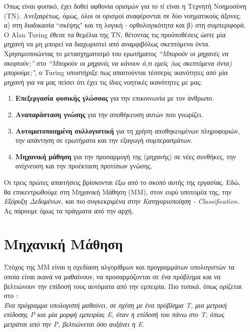 Όπως είναι φυσικό, έχει δοθεί αφθονία ορισμών για το \emph{τί} είναι η Τεχνητή Νοημοσύνη (ΤΝ). Ανεξαιρέτως, όμως, όλοι οι ορισμοί αναφέρονται σε δύο νοηματικούς άξονες: α) στη διαδικασία “σκέψης" και τη λογική - ορθολογικότητα και β) στη συμπεριφορά. Ο Alan Turing έθεσε τα θεμέλια της ΤΝ, θέτοντας τις προϋποθέσεις ώστε μία μηχανή να μη μπορεί να διαχωριστεί από αναμφιβόλως σκεπτόμενα όντα. Χρησιμοποιώντας το μετασχηματισμό του ερωτήματος \emph{“Μπορούν οι μηχανές να σκεφτούν;”} στο \emph{“Μπορούν οι μηχανές να κάνουν ό,τι εμείς (ως σκεπτόμενα όντα) μπορούμε;"}, ο Turing υποστήριξε πως απαιτούνται τέσσερις ικανότητες από μία μηχανή για να μας πείσει ότι έχει τις ίδιες νοητικές ικανότητες με μας:
\begin{enumerate}
  \item \textbf{Επεξεργασία φυσικής γλώσσας} για την επικοινωνία με τον άνθρωπο.
  \item \textbf{Αναπαράσταση γνώσης} για την αποθήκευση αυτών που γνωρίζει.
  \item \textbf{Αυτοματοποιημένη συλλογιστική} για τη χρήση αποθηκευμένων πληροφοριών, την απάντηση σε ερωτήματα και την εξαγωγή συμπερασμάτων.
  \item \textbf{Μηχανική μάθηση} για την προσαρμογή της (μηχανής) σε νέες συνθήκες, την ανίχνευση και την προέκταση προτύπων γνώσης.
\end{enumerate}

Οι τρεις πρώτες απαιτήσεις βρίσκονται έξω από το σκοπό αυτής της εργασίας. Εδώ, θα επικεντρωθούμε στη Μηχανική Μάθηση (ΜΜ), στον ευρύ υποτομέα της, την \emph{Εξόρυξη Δεδομένων}, και πιο συγκεκριμένα στην \emph{Κατηγοριοποίηση - Classification}. Ας πάρουμε όμως τα πράγματα από την αρχή. 

\section{Μηχανική Μάθηση}
Στόχος της ΜΜ είναι η σχεδίαση αλγορίθμων και προγραμμάτων υπολογιστών τα οποία είναι ικανά να μαθαίνουν, να προσαρμόζονται σε ένα πρόβλημα και να βελτιώνουν την επίδοσή τους αυτόματα από την εμπειρία. Πιο τυπικά, όπως ορίζεται στο \cite{mitchell}:
\\

\emph{Ένα πρόγραμμα υπολογιστή μαθαίνει, σε σχέση με ένα πρόβλημα Τ, μια μετρική επίδοσης Ρ και μία μορφή εμπειρίας Ε, όταν η επίδοσή του πάνω στο Τ, όπως μετράται από την Ρ, βελτιώνεται όσο αυξάνει η Ε}.
\\


